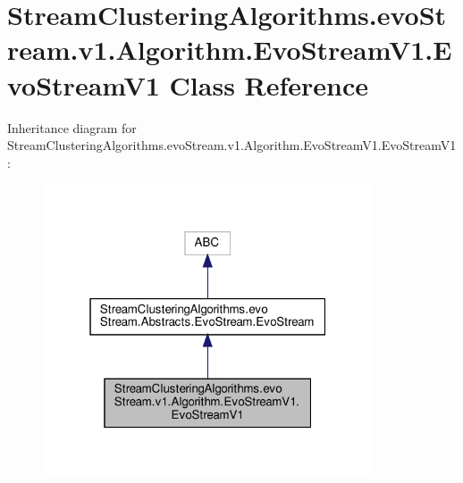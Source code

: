 \hypertarget{classStreamClusteringAlgorithms_1_1evoStream_1_1v1_1_1Algorithm_1_1EvoStreamV1_1_1EvoStreamV1}{}\section{Stream\+Clustering\+Algorithms.\+evo\+Stream.\+v1.\+Algorithm.\+Evo\+Stream\+V1.\+Evo\+Stream\+V1 Class Reference}
\label{classStreamClusteringAlgorithms_1_1evoStream_1_1v1_1_1Algorithm_1_1EvoStreamV1_1_1EvoStreamV1}


Inheritance diagram for Stream\+Clustering\+Algorithms.\+evo\+Stream.\+v1.\+Algorithm.\+Evo\+Stream\+V1.\+Evo\+Stream\+V1\+:\nopagebreak
\begin{figure}[H]
\begin{center}
\leavevmode
\includegraphics[width=277pt]{classStreamClusteringAlgorithms_1_1evoStream_1_1v1_1_1Algorithm_1_1EvoStreamV1_1_1EvoStreamV1__inherit__graph}
\end{center}
\end{figure}


